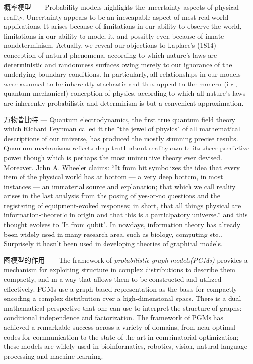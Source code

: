 \documentclass{article}
\theoremstyle{definition}
\theoremstyle{remark}
\theoremstyle{definition}
\begin{document}
\begin{CJK*}{UTF8}{gbsn}
概率模型 ----
Probability models highlights the uncertainty aspects of physical reality. Uncertainty appears to be an inescapable aspect of most real-world applications. It arises because of limitations in our ability to observe the world, limitations in our ability to model it, and possibly even because of innate nondeterminism. Actually, we reveal our objections to Laplace’s (1814) conception of natural phenomena, according to which nature’s laws are deterministic and randomness surfaces owing merely to our ignorance of the underlying boundary conditions. In particularly, all relationships in our models were assumed to be inherently stochastic and thus appeal to the modern (i.e., quantum mechanical) conception of physics, according to which all nature’s laws are inherently probabilistic and determinism is but a convenient approximation.

万物皆比特 ---
Quantum electrodynamics, the first true quantum field theory which Richard Feynman called it the "the jewel of physics" of all mathematical descriptions of our universe, has produced the mostly stunning precise results. Quantum mechanisms reflects deep truth about reality own to its sheer predictive power though which is perhaps the most unintuitive theory ever devised. Moreover, John A. Wheeler claims: “It from bit symbolizes the idea that every item of the physical world has at bottom — a very deep bottom, in most instances — an immaterial source and explanation; that which we call reality arises in the last analysis from the posing of yes-or-no questions and the registering of equipment-evoked responses; in short, that all things physical are information-theoretic in origin and that this is a participatory universe\cite{wheeler1990information}.” and this thought evolves to "It from qubit". In nowdays, information theory has already been widely used in many research area, such as biology, computing etc.. Surprisely it hasn't been used in developing theories of graphical models.   



图模型的作用 ----
The framework of \emph{probabilistic graph models(PGMs)} provides a mechanism for exploiting structure in complex distributions to describe them compactly, and in a way that allows them to be constructed and utilized effectively. PGMs use a graph-based representation as the basis for compactly encoding a complex distribution over a high-dimensional space. There is a dual mathematical perspective that one can use to interpret the structure of graphs: conditional independence and factorization\cite{koller2009probabilistic}. The framework of PGMs has achieved a remarkable success across a variety of domains, from near-optimal codes for communication to the state-of-the-art in combinatorial optimization; these models are widely used in bioinformatics, robotics, vision, natural language processing and machine learning.


\end{CJK*}
\end{document}
